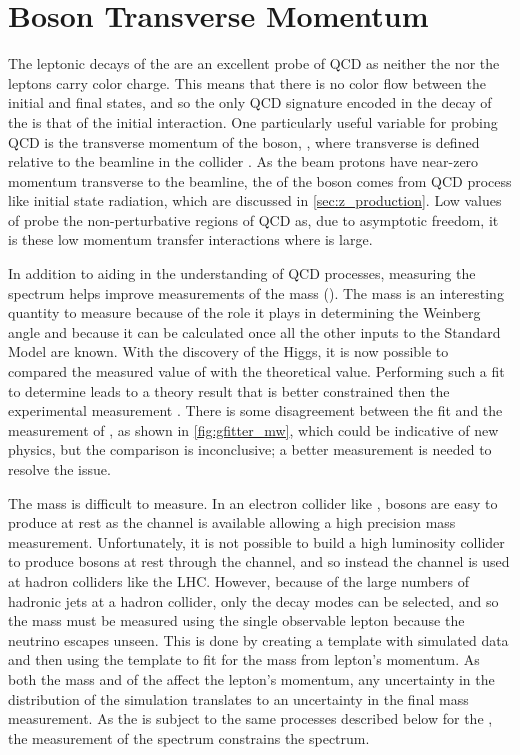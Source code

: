\section{\texorpdfstring{\Z}{Z} Boson Transverse Momentum}

The leptonic decays of the \Z are an excellent probe of QCD as neither the \Z
nor the leptons carry color charge. This means that there is no color flow
between the initial and final states, and so the only QCD signature encoded in
the decay of the \Z is that of the initial interaction. One particularly useful
variable for probing QCD is the transverse momentum of the \Z boson, \bosonpt,
where transverse is defined relative to the beamline in the collider
\cite{bozzi_2011,mantry_2011,becher_2011}. As the beam protons have near-zero
momentum transverse to the beamline, the \bosonpt of the \Z boson comes from
QCD process like initial state radiation, which are discussed in
\cref{sec:z_production}. Low values of \bosonpt probe the non-perturbative
regions of QCD as, due to asymptotic freedom, it is these low momentum transfer
interactions where \alphastrong is large.

In addition to aiding in the understanding of QCD processes, measuring the \Z
\bosonpt spectrum helps improve measurements of the \W mass (\MassW). The \W
mass is an interesting quantity to measure because of the role it plays in
determining the Weinberg angle and because it can be calculated once all the
other inputs to the Standard Model are known. With the discovery of the Higgs,
it is now possible to compared the measured value of \MassW with the
theoretical value. Performing such a fit to determine \MassW leads to a theory
result that is better constrained then the experimental measurement
\cite{baak_2014}. There is some disagreement between the fit and the
measurement of \MassW, as shown in \cref{fig:gfitter_mw}, which could be
indicative of new physics, but the comparison is inconclusive; a better
measurement is needed to resolve the issue. %



The \W mass is difficult to measure. In an electron collider like \LEP, \Z
bosons are easy to produce at rest as the \eetoZ channel is available allowing
a high precision mass measurement. Unfortunately, it is not possible to build a
high luminosity collider to produce \W bosons at rest through the \enutoW
channel, and so instead the \qqtoW channel is used at hadron colliders like the
LHC. However, because of the large numbers of hadronic jets at a hadron
collider, only the \Wtolnu decay modes can be selected, and so the mass must be
measured using the single observable lepton because the neutrino escapes
unseen. This is done by creating a template with simulated data and then using
the template to fit for the mass from lepton's momentum. As both the mass and
\bosonpt of the \W affect the lepton's momentum, any uncertainty in the
\bosonpt distribution of the simulation translates to an uncertainty in the
final mass measurement. As the \W is subject to the same processes described
below for the \Z, the measurement of the \Z \bosonpt spectrum constrains the \W
\bosonpt spectrum.

